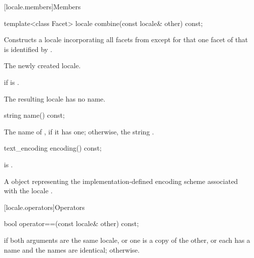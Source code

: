 [locale.members]{Members}

%
\begin{itemdecl}
template<class Facet> locale combine(const locale& other) const;
\end{itemdecl}

\begin{itemdescr}
\pnum
\effects
Constructs a locale incorporating all facets from 
except for that one facet of  that is identified by .

\pnum
\returns
The newly created locale.

\pnum
\throws
{} if  is .

\pnum
\remarks
The resulting locale has no name.
\end{itemdescr}

%
\begin{itemdecl}
string name() const;
\end{itemdecl}

\begin{itemdescr}
\pnum
\returns
The name of , if it has one;
otherwise, the string .
\end{itemdescr}

%
\begin{itemdecl}
text_encoding encoding() const;
\end{itemdecl}

\begin{itemdescr}
\pnum
\mandates
{} is .

\pnum
\returns
A  object representing
the implementation-defined encoding scheme
associated with the locale .
\end{itemdescr}

[locale.operators]{Operators}

%
\begin{itemdecl}
bool operator==(const locale& other) const;
\end{itemdecl}

\begin{itemdescr}
\pnum
\returns
{} if
both arguments are the same locale, or
one is a copy of the other, or
each has a name and the names are identical;
 otherwise.
\end{itemdescr}

